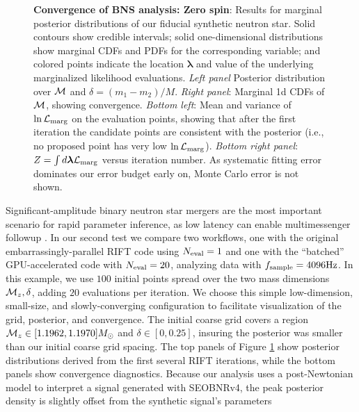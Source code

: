 \documentclass[twocolumn,prd,nofootinbib]{revtex4}
\newcommand\unit[1]{{\rm #1}}
\newcommand\editremark[1]{{\color{red} #1}}
\newcommand{\mc}{{\cal M}}
\begin{document}
\begin{figure}
\caption{\label{fig:BNS:MultiIterate}\textbf{Convergence of BNS analysis: Zero spin}: Results for marginal posterior distributions
  of our fiducial synthetic neutron star.  Solid contours show credible intervals; solid one-dimensional distributions
  show marginal CDFs and PDFs for the corresponding variable; and colored points indicate the location $\bm{\lambda}$ and
  value of the underlying marginalized likelihood evaluations.  
\emph{Left panel } Posterior distribution
  over  $\mc$ and
  $\delta=(m_1-m_2)/M$.    \emph{Right panel}: Marginal 1d CDFs of $\mc$, showing convergence.
\emph{Bottom left}: Mean and variance of  $\ln{\cal L}_{\rm marg}$ on the evaluation points,  showing that after the
first iteration the
candidate points are consistent with the posterior (i.e., no proposed point has very low $\ln {\cal L}_{\rm marg}$).
\emph{Bottom right panel}: $Z = \int d\bm{\lambda} {\cal L}_{\rm marg}$ versus iteration number.  As systematic fitting error dominates our
error budget early on, Monte Carlo error is not shown.
}
\end{figure}



Significant-amplitude  binary neutron star mergers are the most important scenario for rapid parameter inference, as low
latency can enable multimessenger followup  \cite{LIGO-O2-Catalog}.    
% 
In our second test we compare two workflows, one with the original embarrassingly-parallel RIFT code using $N_{\rm
  eval}=1$ and one with the
``batched'' GPU-accelerated code with $N_{\rm eval}=20$, analyzing data with $f_{\rm sample}=4096\unit{Hz}$.    
In this example, we use $100$ initial points spread over the two mass dimensions $\mc_z,\delta$, adding $20$ evaluations per
iteration.   We
choose this simple low-dimension, small-size, and slowly-converging configuration to facilitate visualization of the grid, posterior, and convergence.     The initial coarse grid covers a region $\mc_z\in[1.1962,1.1970] M_\odot$ and $\delta \in [0,0.25]$,  insuring the posterior was smaller than our initial
coarse grid spacing.     The top  panels of Figure  \ref{fig:BNS:MultiIterate} show posterior distributions derived
from the first several RIFT iterations, while the bottom panels show convergence diagnostics.
Because our analysis uses a post-Newtonian model to interpret a signal generated with SEOBNRv4, the peak posterior
density is slightly  offset
 from the synthetic signal's parameters
\end{document}
